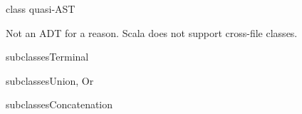 

\begin{frame}{ class quasi-AST}
  \scalebox{0.6}{}

  \medskip

  Not an ADT for a  reason.  Scala does not support cross-file  classes.

\end{frame}

\newsavebox\leafbox
\begin{lrbox}{\leafbox}
  \begin{minipage}{12cm}
    
  \end{minipage}
\end{lrbox}

\begin{frame}{ subclasses}{Terminal}
  \usebox\leafbox
\end{frame}

\newsavebox\orbox
\begin{lrbox}{\orbox}
  \begin{minipage}{12cm}
    
  \end{minipage}
\end{lrbox}

\newsavebox\andbox
\begin{lrbox}{\andbox}
  \begin{minipage}{12cm}
    
  \end{minipage}
\end{lrbox}


\begin{frame}{ subclasses}{Union, Or}
  \usebox\orbox
 \end{frame}




\newsavebox\catbox
\begin{lrbox}{\catbox}
  \begin{minipage}{12cm}
    
  \end{minipage}
\end{lrbox}


\begin{frame}{ subclasses}{Concatenation}
  \usebox\catbox
 \end{frame}



\newsavebox\starbox
\begin{lrbox}{\starbox}
  \begin{minipage}{12cm}
    
  \end{minipage}
\end{lrbox}

